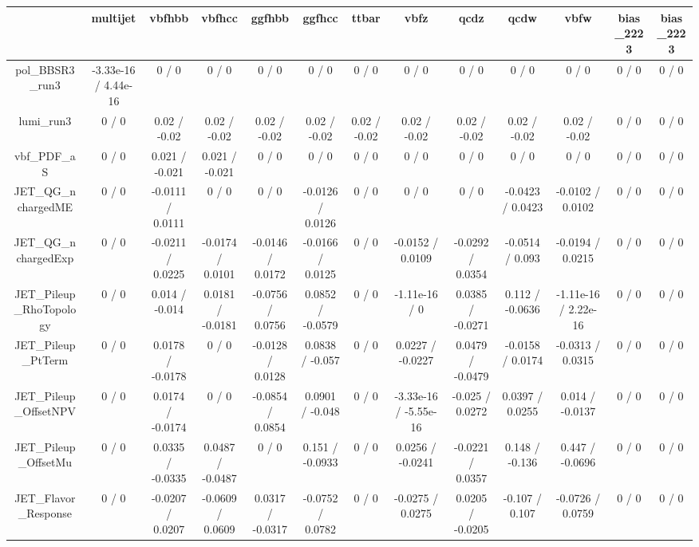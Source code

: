 \documentclass[10pt]{article}
\begin{document}
\begin{table}[htbp]
\begin{center}
\begin{tabular}{|c|c|c|c|c|c|c|c|c|c|c|c|c|}
\hline 
      & multijet      & vbfhbb      & vbfhcc      & ggfhbb      & ggfhcc      & ttbar      & vbfz      & qcdz      & qcdw      & vbfw      & bias_2223      & bias_2223 \\ 
\hline 
  pol_BBSR3_run3 & -3.33e-16 / 4.44e-16 & 0 / 0 & 0 / 0 & 0 / 0 & 0 / 0 & 0 / 0 & 0 / 0 & 0 / 0 & 0 / 0 & 0 / 0 & 0 / 0 & 0 / 0 \\ 
  lumi_run3 & 0 / 0 & 0.02 / -0.02 & 0.02 / -0.02 & 0.02 / -0.02 & 0.02 / -0.02 & 0.02 / -0.02 & 0.02 / -0.02 & 0.02 / -0.02 & 0.02 / -0.02 & 0.02 / -0.02 & 0 / 0 & 0 / 0 \\ 
  vbf_PDF_aS & 0 / 0 & 0.021 / -0.021 & 0.021 / -0.021 & 0 / 0 & 0 / 0 & 0 / 0 & 0 / 0 & 0 / 0 & 0 / 0 & 0 / 0 & 0 / 0 & 0 / 0 \\ 
  JET_QG_nchargedME & 0 / 0 & -0.0111 / 0.0111 & 0 / 0 & 0 / 0 & -0.0126 / 0.0126 & 0 / 0 & 0 / 0 & 0 / 0 & -0.0423 / 0.0423 & -0.0102 / 0.0102 & 0 / 0 & 0 / 0 \\ 
  JET_QG_nchargedExp & 0 / 0 & -0.0211 / 0.0225 & -0.0174 / 0.0101 & -0.0146 / 0.0172 & -0.0166 / 0.0125 & 0 / 0 & -0.0152 / 0.0109 & -0.0292 / 0.0354 & -0.0514 / 0.093 & -0.0194 / 0.0215 & 0 / 0 & 0 / 0 \\ 
  JET_Pileup_RhoTopology & 0 / 0 & 0.014 / -0.014 & 0.0181 / -0.0181 & -0.0756 / 0.0756 & 0.0852 / -0.0579 & 0 / 0 & -1.11e-16 / 0 & 0.0385 / -0.0271 & 0.112 / -0.0636 & -1.11e-16 / 2.22e-16 & 0 / 0 & 0 / 0 \\ 
  JET_Pileup_PtTerm & 0 / 0 & 0.0178 / -0.0178 & 0 / 0 & -0.0128 / 0.0128 & 0.0838 / -0.057 & 0 / 0 & 0.0227 / -0.0227 & 0.0479 / -0.0479 & -0.0158 / 0.0174 & -0.0313 / 0.0315 & 0 / 0 & 0 / 0 \\ 
  JET_Pileup_OffsetNPV & 0 / 0 & 0.0174 / -0.0174 & 0 / 0 & -0.0854 / 0.0854 & 0.0901 / -0.048 & 0 / 0 & -3.33e-16 / -5.55e-16 & -0.025 / 0.0272 & 0.0397 / 0.0255 & 0.014 / -0.0137 & 0 / 0 & 0 / 0 \\ 
  JET_Pileup_OffsetMu & 0 / 0 & 0.0335 / -0.0335 & 0.0487 / -0.0487 & 0 / 0 & 0.151 / -0.0933 & 0 / 0 & 0.0256 / -0.0241 & -0.0221 / 0.0357 & 0.148 / -0.136 & 0.447 / -0.0696 & 0 / 0 & 0 / 0 \\ 
  JET_Flavor_Response & 0 / 0 & -0.0207 / 0.0207 & -0.0609 / 0.0609 & 0.0317 / -0.0317 & -0.0752 / 0.0782 & 0 / 0 & -0.0275 / 0.0275 & 0.0205 / -0.0205 & -0.107 / 0.107 & -0.0726 / 0.0759 & 0 / 0 & 0 / 0 \\ 

\end{tabular}
\end{center}
\end{table}
\end{document}
